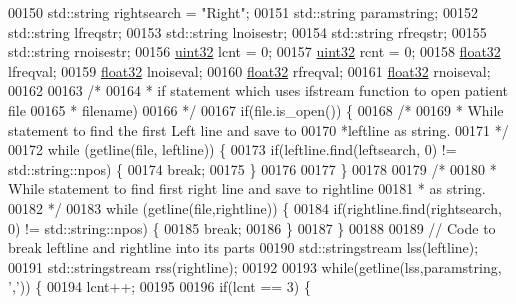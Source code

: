 \begin{DoxyCode}
00150         std::string rightsearch = \textcolor{stringliteral}{"Right"};
00151         std::string paramstring;
00152         std::string lfreqstr;
00153         std::string lnoisestr;
00154         std::string rfreqstr;
00155         std::string rnoisestr;
00156         \hyperlink{definitions_8hpp_a1134b580f8da4de94ca6b1de4d37975e}{uint32} lcnt = 0;
00157         \hyperlink{definitions_8hpp_a1134b580f8da4de94ca6b1de4d37975e}{uint32} rcnt = 0;
00158         \hyperlink{definitions_8hpp_aacdc525d6f7bddb3ae95d5c311bd06a1}{float32} lfreqval;
00159         \hyperlink{definitions_8hpp_aacdc525d6f7bddb3ae95d5c311bd06a1}{float32} lnoiseval;
00160         \hyperlink{definitions_8hpp_aacdc525d6f7bddb3ae95d5c311bd06a1}{float32} rfreqval;
00161         \hyperlink{definitions_8hpp_aacdc525d6f7bddb3ae95d5c311bd06a1}{float32} rnoiseval;
00162 
00163         \textcolor{comment}{/*}
00164 \textcolor{comment}{         * if statement which uses ifstream function to open patient file }
00165 \textcolor{comment}{         * filename)}
00166 \textcolor{comment}{         */}
00167         \textcolor{keywordflow}{if}(file.is\_open()) \{
00168             \textcolor{comment}{/*}
00169 \textcolor{comment}{             * While statement to find the first Left line and save to }
00170 \textcolor{comment}{             *leftline as string.}
00171 \textcolor{comment}{             */}
00172             \textcolor{keywordflow}{while} (getline(file, leftline)) \{
00173                 \textcolor{keywordflow}{if}(leftline.find(leftsearch, 0) != std::string::npos) \{
00174                     \textcolor{keywordflow}{break};
00175                 \}
00176 
00177             \}
00178 
00179             \textcolor{comment}{/*}
00180 \textcolor{comment}{             * While statement to find first right line and save to rightline}
00181 \textcolor{comment}{             * as string.}
00182 \textcolor{comment}{             */}
00183             \textcolor{keywordflow}{while} (getline(file,rightline)) \{
00184                 \textcolor{keywordflow}{if}(rightline.find(rightsearch, 0) != std::string::npos) \{
00185                     \textcolor{keywordflow}{break};
00186                 \}
00187             \}
00188 
00189             \textcolor{comment}{// Code to break leftline and rightline into its parts}
00190             std::stringstream lss(leftline);
00191             std::stringstream rss(rightline);
00192 
00193             \textcolor{keywordflow}{while}(getline(lss,paramstring, \textcolor{charliteral}{','})) \{
00194                 lcnt++;
00195 
00196                 \textcolor{keywordflow}{if}(lcnt == 3) \{

\end{DoxyCode}

